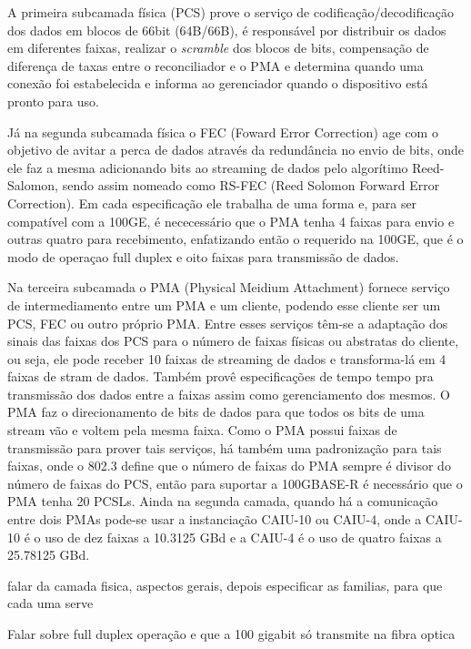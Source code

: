 \documentclass[a4paper,12pt]{article}
\begin{document}
A primeira subcamada física (PCS) prove o serviço de codificação/decodificação dos dados em blocos de 66bit (64B/66B), é responsável por distribuir os dados em diferentes faixas, realizar o \textit{scramble} dos blocos de bits, compensação de diferença de taxas entre o reconciliador e o PMA e determina quando uma conexão foi estabelecida e informa ao gerenciador quando o dispositivo está pronto para uso. 

Já na segunda subcamada física o FEC (Foward Error Correction) age com o objetivo de avitar a perca de dados através da redundância no envio de bits, onde ele faz a mesma adicionando bits ao streaming de dados pelo algorítimo Reed-Salomon, sendo assim nomeado como RS-FEC (Reed Solomon Forward Error Correction).  Em cada especificação ele trabalha de uma forma e, para ser compatível com a 100GE, é nececessário que o PMA tenha 4 faixas para envio e outras quatro para recebimento, enfatizando então o requerido na 100GE, que é o modo de operaçao full duplex e oito faixas para transmissão de dados.


Na terceira subcamada o PMA (Physical Meidium Attachment) fornece serviço de intermediamento entre um PMA e um cliente, podendo esse cliente ser um PCS, FEC ou outro próprio PMA. Entre esses serviços têm-se a adaptação dos sinais das faixas dos PCS para o número de faixas físicas ou abstratas do cliente, ou seja, ele pode receber 10 faixas de streaming de dados e transforma-lá em 4 faixas de stram de dados. Também provê especificações de tempo tempo pra transmissão dos dados entre a faixas assim como gerenciamento dos mesmos. O PMA faz o direcionamento de bits de dados para que todos os bits de uma stream vão e voltem pela mesma faixa. Como o PMA possui faixas de transmissão para prover tais serviços, há também uma padronização para tais faixas, onde o 802.3 define que o número de faixas do PMA sempre é divisor do número de faixas do PCS, então para suportar a 100GBASE-R é necessário que o PMA tenha 20 PCSLs. Ainda na segunda camada, quando há a comunicação entre dois PMAs pode-se usar a instanciação CAIU-10 ou CAIU-4, onde a CAIU-10 é o uso de dez faixas a 10.3125 GBd e a CAIU-4 é o uso de quatro faixas a 25.78125 GBd.



falar da camada fisica, aspectos gerais, depois especificar as familias, para que cada uma serve

Falar sobre full duplex operação e que a 100 gigabit só transmite na fibra optica
\end{document}
